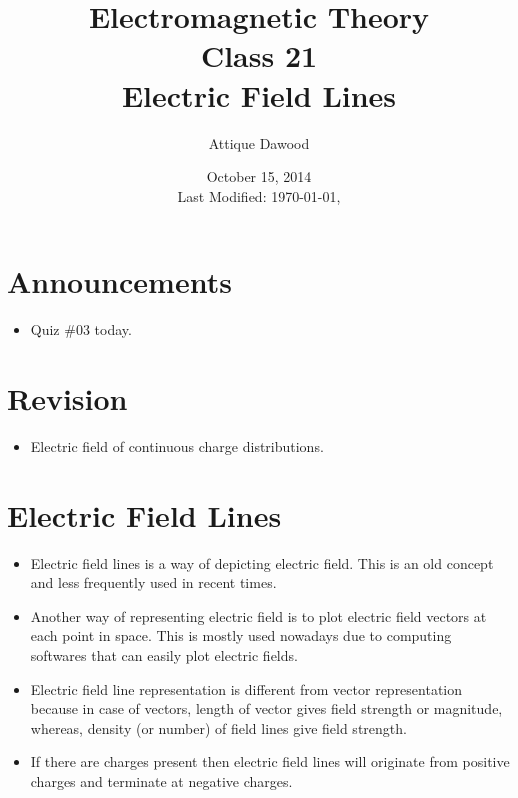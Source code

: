 \documentclass[12pt,a4paper]{article}
\title{Electromagnetic Theory\\Class 21\\Electric Field Lines}
\author{Attique Dawood}
\date{October 15, 2014\\[0.2cm] Last Modified: \today, \currenttime}
\begin{document}
\maketitle
\section{Announcements}
\begin{itemize}
\item Quiz \#03 today.
\end{itemize}
\section{Revision}
\begin{itemize}
\item Electric field of continuous charge distributions.
\end{itemize}
\section{Electric Field Lines}
\begin{itemize}
\item Electric field lines is a way of depicting electric field. This is an old concept and less frequently used in recent times.
\item Another way of representing electric field is to plot electric field vectors at each point in space. This is mostly used nowadays due to computing softwares that can easily plot electric fields.
\item Electric field line representation is different from vector representation because in case of vectors, length of vector gives field strength or magnitude, whereas, density (or number) of field lines give field strength.
\item If there are charges present then electric field lines will originate from positive charges and terminate at negative charges.
\end{itemize}
%
%
\end{document}

